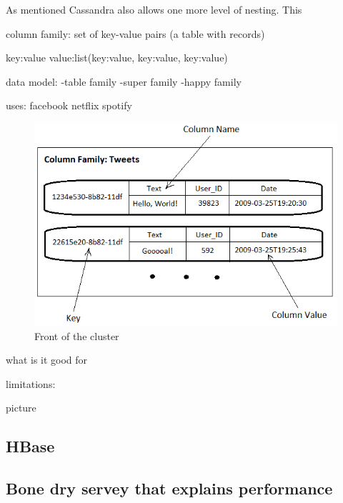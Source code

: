 As mentioned Cassandra also allows one more level of nesting. This 

column family: set of key-value pairs (a table with records)

key:value
value:list(key:value, key:value, key:value)


data model:
	-table family
	-super family
	-happy family

uses:
	facebook
	netflix
	spotify


\begin{figure}[ht]

\quad
\begin{minipage}[b]{0.45\linewidth}
    \includegraphics[width=1\textwidth]{resources/twitterschema-tweets.png}
    \caption{Front of the cluster}
    \label{fig:minipage2}
\end{minipage}
\end{figure}

what is it good for



limitations:
	
picture



\subsection{HBase}

\subsection{Bone dry servey that explains performance}
